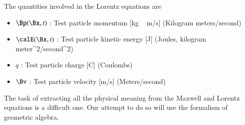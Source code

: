 The quantities involved in the Lorentz equations are

\begin{itemize}
	\item \( \Bp(\Bx, t) \) : Test particle momentum [\si{kg\, m/s}] (Kilogram meters/second)
	\item \( \calE(\Bx, t) \) : Test particle kinetic energy [\si{J}] (Joules, kilogram meter^2/second^2)
	\item \( q \) : Test particle charge [\si{C}] (Coulombs)
	\item \( \Bv \) : Test particle velocity [\si{m/s}] (Meters/second)
\end{itemize}

The task of extracting all the physical meaning from the Maxwell and Lorentz equations is a difficult one.
Our attempt to do so will use the formalism of geometric algebra.

